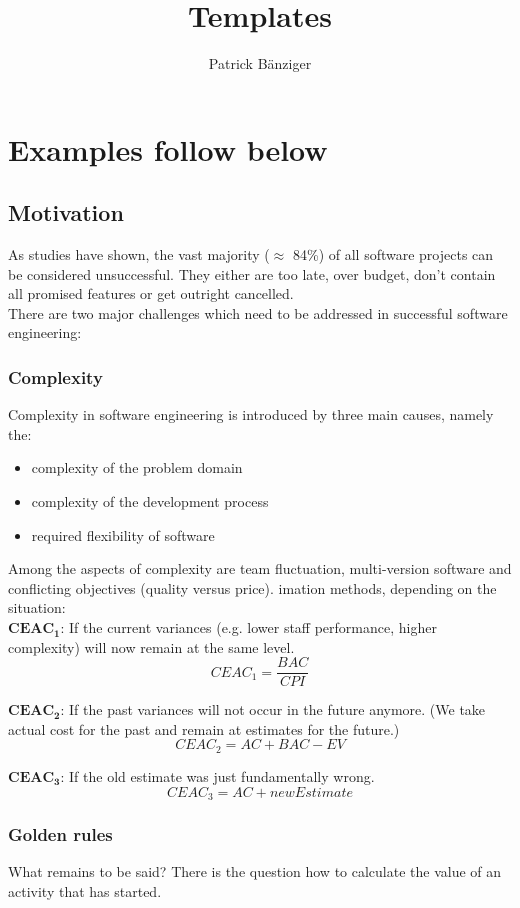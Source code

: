 \documentclass[a4paper, twocolumn]{article}
\title{Templates}
\author{Patrick Bänziger}
\begin{document}
\maketitle

\section{Examples follow below}

\subsection{Motivation}
As studies have shown, the vast majority ($\approx$ 84\%) of all software projects can be considered unsuccessful. They either are too late, over budget, don't contain all promised features or get outright cancelled. \\

There are two major challenges which need to be addressed in successful software engineering:

\subsubsection*{Complexity}
Complexity in software engineering is introduced by three main causes, namely the:
\begin{itemize}
	\item complexity of the problem domain
	\item complexity of the development process
	\item required flexibility of software
\end{itemize}
Among the aspects of complexity are team fluctuation, multi-version software and conflicting objectives (quality versus price).
imation methods, depending on the situation:\\

$\mathbf{CEAC_1}$: If the current variances (e.g. lower staff performance, higher complexity) will now remain at the same level.
$$CEAC_1 = \frac{BAC}{CPI}$$

$\mathbf{CEAC_2}$: If the past variances will not occur in the future anymore. (We take actual cost for the past and remain at estimates for the future.)
$$CEAC_2 = AC + BAC - EV$$

$\mathbf{CEAC_3}$: If the old estimate was just fundamentally wrong.
$$CEAC_3 = AC + newEstimate$$

\subsubsection{Golden rules}
What remains to be said? There is the question how to calculate the value of an activity that has started.
\end{document}
